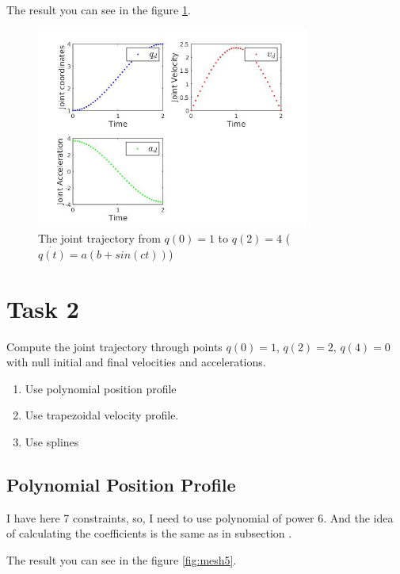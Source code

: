 \documentclass[12pt, a4paper]{report}
\begin{document}
The result you can see in the figure \ref{fig:mesh4}.

\begin{figure}[H]
	\centering
		\includegraphics[width=0.8\textwidth]{13} %
	\caption{The joint trajectory from $q(0) = 1$ to $q(2) = 4$ ($\dot{q(t)} = a(b + sin(ct))$)} %
	\label{fig:mesh4}
\end{figure}

\section*{Task 2} \label{sec:Task 2}
%

Compute the joint trajectory through points $q(0) = 1$, $q(2) = 2$, $q(4) = 0$
with null initial and final velocities and accelerations.
\begin{enumerate}
	\item  Use polynomial position profile
	\item  Use trapezoidal velocity profile.
	\item  Use splines
\end{enumerate}

{\centering
\subsection*{Polynomial Position Profile}
}
%

I have here 7 constraints, so, I need to use polynomial of power 6. And the idea of calculating the coefficients is the same as in subsection .

The result you can see in the figure \ref{fig:mesh5}.
\end{document}
